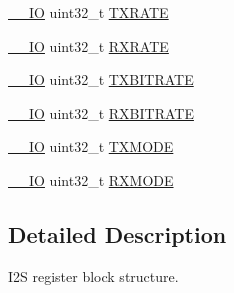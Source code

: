 \begin{DoxyCompactItemize}
\hyperlink{core__cm3_8h_aec43007d9998a0a0e01faede4133d6be}{\-\_\-\-\_\-\-I\-O} uint32\-\_\-t \hyperlink{structLPC__I2S__T_ab62a8a48830412bcf4cec1b1ed5a5b21}{T\-X\-R\-A\-T\-E}
\item 
\hyperlink{core__cm3_8h_aec43007d9998a0a0e01faede4133d6be}{\-\_\-\-\_\-\-I\-O} uint32\-\_\-t \hyperlink{structLPC__I2S__T_a03d51065fa11a182809e189b919b034a}{R\-X\-R\-A\-T\-E}
\item 
\hyperlink{core__cm3_8h_aec43007d9998a0a0e01faede4133d6be}{\-\_\-\-\_\-\-I\-O} uint32\-\_\-t \hyperlink{structLPC__I2S__T_a16c60f11507aee3e4aef26c365a02ce2}{T\-X\-B\-I\-T\-R\-A\-T\-E}
\item 
\hyperlink{core__cm3_8h_aec43007d9998a0a0e01faede4133d6be}{\-\_\-\-\_\-\-I\-O} uint32\-\_\-t \hyperlink{structLPC__I2S__T_a3f0c2587313eb723ac48ad06af157df9}{R\-X\-B\-I\-T\-R\-A\-T\-E}
\item 
\hyperlink{core__cm3_8h_aec43007d9998a0a0e01faede4133d6be}{\-\_\-\-\_\-\-I\-O} uint32\-\_\-t \hyperlink{structLPC__I2S__T_a30384953ab71a349e60ed555b4ec4552}{T\-X\-M\-O\-D\-E}
\item 
\hyperlink{core__cm3_8h_aec43007d9998a0a0e01faede4133d6be}{\-\_\-\-\_\-\-I\-O} uint32\-\_\-t \hyperlink{structLPC__I2S__T_a257e2de4bfa371adba9eeb4c2e95fe09}{R\-X\-M\-O\-D\-E}
\end{DoxyCompactItemize}


\subsection{Detailed Description}
I2\-S register block structure. 


